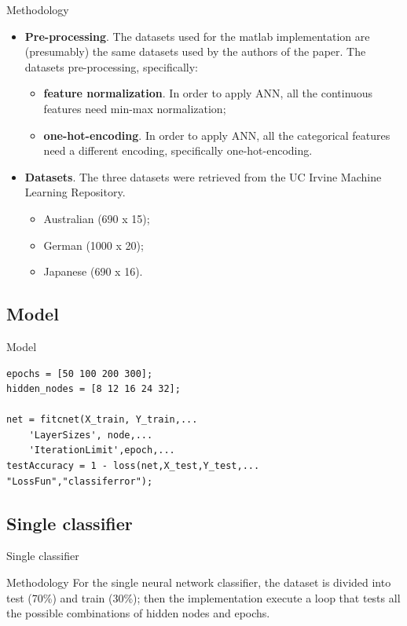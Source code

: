 \documentclass[12pt]{beamer}
\begin{document}
\begin{frame}{Methodology}
  \begin{itemize}
    \item \textbf{Pre-processing}. The datasets used for the matlab implementation
      are (presumably) the same datasets used by the authors of the paper. The datasets
      pre-processing, specifically:
      \begin{itemize}
        \item \textbf{feature normalization}. In order to apply ANN, all the continuous
          features need min-max normalization;
        \item \textbf{one-hot-encoding}. In order to apply ANN, all the categorical
          features need a different encoding, specifically one-hot-encoding.
      \end{itemize}
    \item \textbf{Datasets}. The three datasets were retrieved from the UC Irvine Machine Learning Repository.
      \begin{itemize}
        \item Australian (690 x 15);
        \item German (1000 x 20);
        \item Japanese (690 x 16).
      \end{itemize}
  \end{itemize}
\end{frame}

\subsection{Model}

\begin{frame}[fragile]{Model}
  \begin{lstlisting}[style=matlab]
epochs = [50 100 200 300];
hidden_nodes = [8 12 16 24 32];

net = fitcnet(X_train, Y_train,...
    'LayerSizes', node,...
    'IterationLimit',epoch,...
testAccuracy = 1 - loss(net,X_test,Y_test,...
"LossFun","classiferror");
  \end{lstlisting}
\end{frame}

\subsection{Single classifier}

\begin{frame}{Single classifier}
  \begin{block}{Methodology}
    For the single neural network classifier, the dataset is divided into test
    (70\%) and train (30\%); then the implementation execute a loop
    that tests all the possible combinations of hidden nodes and epochs.
  \end{block}
\end{frame}
\end{document}
